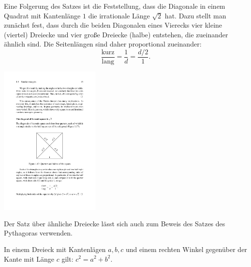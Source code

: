 Eine Folgerung des Satzes ist die Feststellung, dass die Diagonale in einem Quadrat mit Kantenlänge
$1$ die irrationale Länge $\sqrt{2}$ %
hat. Dazu stellt man zunächst fest, dass durch die beiden Diagonalen eines Vierecks vier kleine
(viertel) Dreiecke und vier große Dreiecke (halbe) entstehen, die zueinander ähnlich sind. Die
Seitenlängen sind daher proportional zueinander:
$$
    \frac{\mbox{kurz}}{\mbox{lang}} = \frac{1}{d} = \frac{d/2}{1}.
$$

\begin{center}
    \includegraphics[width=5cm]{BILDER/BildDiagonaleImQuadrat.pdf}
\end{center}

Der Satz über ähnliche Dreiecke lässt sich auch zum Beweis des Satzes des Pythagoras verwenden.


\begin{thm}
    In einem Dreieck mit Kantenlägen $a,b,c$ und einem rechten Winkel gegenüber der Kante mit Länge
    $c$ gilt: $c^2=a^2+b^2$.
\end{thm}

